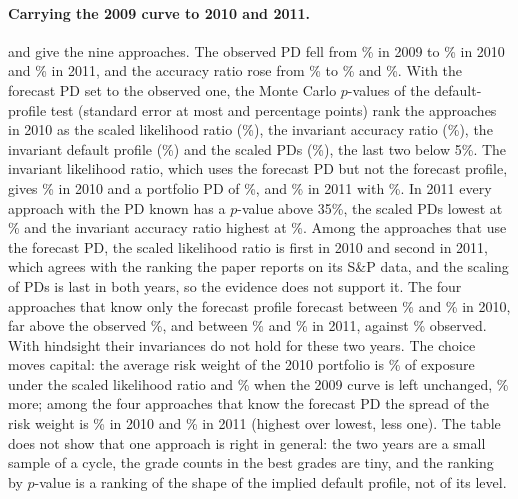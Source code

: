 

\paragraph{Carrying the 2009 curve to 2010 and 2011.}  and  give the nine approaches. The observed PD fell from \rtgQmmPd{}\% in 2009 to \rtgCalYaObs{}\% in 2010 and \rtgCalYbObs{}\% in 2011, and the accuracy ratio rose from \rtgQmmAr{}\% to \rtgCalYaArObs{}\% and \rtgCalYbArObs{}\%. With the forecast PD set to the observed one, the Monte Carlo $p$-values of the default-profile test (standard error at most \rtgCalYaMcseMax{} and \rtgCalYbMcseMax{} percentage points) rank the approaches in 2010 as the scaled likelihood ratio (\rtgCalYaSlrP{}\%), the invariant accuracy ratio (\rtgCalYaIarP{}\%), the invariant default profile (\rtgCalYaIdpP{}\%) and the scaled PDs (\rtgCalYaSpdP{}\%), the last two below 5\%. The invariant likelihood ratio, which uses the forecast PD but not the forecast profile, gives \rtgCalYaIlrbP{}\% in 2010 and a portfolio PD of \rtgCalYaIlrbPd{}\%, and \rtgCalYbIlrbP{}\% in 2011 with \rtgCalYbIlrbPd{}\%. In 2011 every approach with the PD known has a $p$-value above 35\%, the scaled PDs lowest at \rtgCalYbSpdP{}\% and the invariant accuracy ratio highest at \rtgCalYbIarP{}\%. Among the approaches that use the forecast PD, the scaled likelihood ratio is first in 2010 and second in 2011, which agrees with the ranking the paper reports on its S\&P data, and the scaling of PDs is last in both years, so the evidence does not support it. The four approaches that know only the forecast profile forecast between \rtgCalYaIpcPd{}\% and \rtgCalYaIlrcPd{}\% in 2010, far above the observed \rtgCalYaObs{}\%, and between \rtgCalYbIlrcPd{}\% and \rtgCalYbIpcPd{}\% in 2011, against \rtgCalYbObs{}\% observed. With hindsight their invariances do not hold for these two years. The choice moves capital: the average risk weight of the 2010 portfolio is \rtgCalYaSlrRw{}\% of exposure under the scaled likelihood ratio and \rtgCalYaIpcRw{}\% when the 2009 curve is left unchanged, \rtgCalYaStale{}\% more; among the four approaches that know the forecast PD the spread of the risk weight is \rtgCalYaSpread{}\% in 2010 and \rtgCalYbSpread{}\% in 2011 (highest over lowest, less one). The table does not show that one approach is right in general: the two years are a small sample of a cycle, the grade counts in the best grades are tiny, and the ranking by $p$-value is a ranking of the shape of the implied default profile, not of its level.

